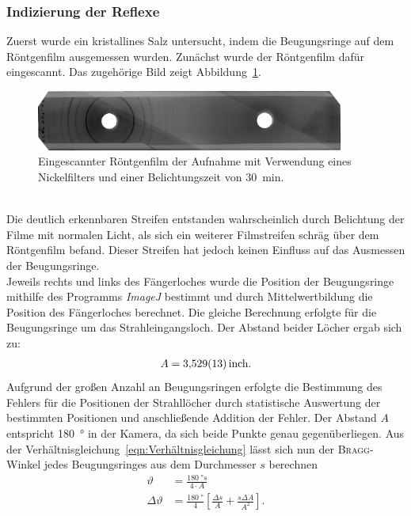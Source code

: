 \documentclass[a4paper,twoside,final]{article}
\begin{document}
\subsubsection{Indizierung der Reflexe}
Zuerst wurde ein kristallines Salz untersucht, indem die Beugungsringe auf dem Röntgenfilm ausgemessen wurden. Zunächst wurde der Röntgenfilm dafür eingescannt. Das zugehörige Bild zeigt Abbildung~\ref{fig:Film_mitFilter}.
\begin{figure}[htp]
    \centering
        \includegraphics[width=0.9\textwidth]{Abbildungen/Roentgenfilm_mit_Filter.jpg}
    \caption{Eingescannter Röntgenfilm der Aufnahme mit Verwendung eines Nickelfilters und einer Belichtungszeit von \SI{30}{\minute}.}
    \label{fig:Film_mitFilter}
\end{figure}\\
Die deutlich erkennbaren Streifen entstanden wahrscheinlich durch Belichtung der Filme mit normalen Licht, als sich ein weiterer Filmstreifen schräg über dem Röntgenfilm befand. Dieser Streifen hat jedoch keinen Einfluss auf das Ausmessen der Beugungsringe.\\
Jeweils rechts und links des Fängerloches wurde die Position der Beugungsringe mithilfe des Programms \textit{ImageJ} bestimmt und durch Mittelwertbildung die Position des Fängerloches berechnet. Die gleiche Berechnung erfolgte für die Beugungsringe um das Strahleingangsloch. Der Abstand beider Löcher ergab sich zu:
\begin{align}
  A = \SI{3,529\pm 0,013}{\text{inch}}.
\end{align}
Aufgrund der großen Anzahl an Beugungsringen erfolgte die Bestimmung des Fehlers für die Positionen der Strahllöcher durch statistische Auswertung der bestimmten Positionen und anschließende Addition der Fehler. Der Abstand $A$ entspricht \SI{180}{\degree} in der Kamera, da sich beide Punkte genau gegenüberliegen. Aus der Verhältnisgleichung~\eqref{eqn:Verhältnisgleichung} lässt sich nun der \textsc{Bragg}-Winkel jedes Beugungsringes aus dem Durchmesser $s$ berechnen
\begin{align}
  \vartheta &= \frac{\SI{180}{\degree}s}{4\cdot A}\\
  \Delta \vartheta &= \frac{\SI{180}{\degree}}{4}\left[\frac{\Delta s}{A} + \frac{s\Delta A}{A^2}\right].
\end{align}
\end{document}
